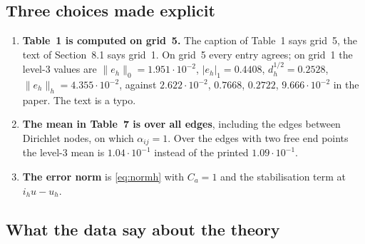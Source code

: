 \documentclass[11pt]{article}
\begin{document}
\subsection{Three choices made explicit}\label{sec:clar}

\begin{enumerate}[leftmargin=*]
\item \textbf{Table~1 is computed on grid~5.} The caption of Table~1 says grid~5, the text of Section~8.1 says grid~1.
  On grid~5 every entry agrees; on grid~1 the level-3 values are $\|e_h\|_0=1.951\cdot10^{-2}$,
  $|e_h|_1=0.4408$, $d_h^{1/2}=0.2528$, $\|e_h\|_h=4.355\cdot10^{-2}$, against $2.622\cdot10^{-2}$, $0.7668$, $0.2722$,
  $9.666\cdot10^{-2}$ in the paper. The text is a typo.
\item \textbf{The mean in Table~7 is over all edges}, including the edges between Dirichlet nodes, on which
  $\alpha_{ij}=1$. Over the edges with two free end points the level-3 mean is $1.04\cdot10^{-1}$ instead of the
  printed $1.09\cdot10^{-1}$.
\item \textbf{The error norm} is \eqref{eq:normh} with $C_a=1$ and the stabilisation term at $i_hu-u_h$.
\end{enumerate}

\subsection{What the data say about the theory}\label{sec:theory}
\end{document}

